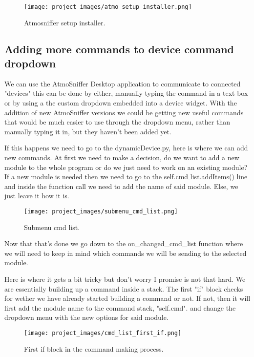 \begin{figure}[H]
\centering
\texttt{[image: project\_images/atmo\_setup\_installer.png]}
 \caption{Atmosniffer setup installer.}
 \label{fig:atmo setup installer}
\end{figure}

\subsection{Adding more commands to device command dropdown}
	We can use the AtmoSniffer Desktop application to communicate to connected "devices" this can be done by either, manually typing the command in a text box or by using a the custom dropdown embedded into a device widget. With the addition of new AtmoSniffer versions we could be getting new useful commands that would be much easier to use through the dropdown menu, rather than manually typing it in, but they haven't been added yet.

	If this happens we need to go to the dynamicDevice.py, here is where we can add new commands. At first we need to make a decision, do we want to add a new module to the whole program or do we just need to work on an existing module? If a new module is needed then we need to go to the self.cmd$\_$list.addItems() line and inside the function call we need to add the name of said module. Else, we just leave it how it is.

\begin{figure}[H]
\centering
\texttt{[image: project\_images/submenu\_cmd\_list.png]}
 \caption{Submenu cmd list.}
 \label{fig:submenu cmd listr}
\end{figure}

	Now that that's done we go down to the on\_changed\_cmd\_list function where we will need to keep in mind which commands we will be sending to the selected module.

	Here is where it gets a bit tricky but don't worry I promise is not that hard. We are essentially building up a command inside a stack. The first "if" block checks for wether we have already started building a command or not. If not, then it will first add the module name to the command stack, "self.cmd". and change the dropdown menu with the new options for said module.

\begin{figure}[H]
\centering
\texttt{[image: project\_images/cmd\_list\_first\_if.png]}
 \caption{First if block in the command making process.}
 \label{fig:cmd list first if}
\end{figure}

